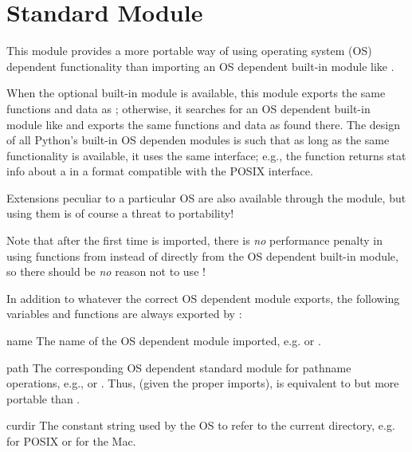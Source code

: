 \section{Standard Module }

This module provides a more portable way of using operating system
(OS) dependent functionality than importing an OS dependent built-in
module like .

When the optional built-in module  is available, this
module exports the same functions and data as ; otherwise,
it searches for an OS dependent built-in module like  and
exports the same functions and data as found there.  The design of all
Python's built-in OS dependen modules is such that as long as the same
functionality is available, it uses the same interface; e.g., the
function  returns stat info about a  in a
format compatible with the POSIX interface.

Extensions peculiar to a particular OS are also available through the
 module, but using them is of course a threat to portability!

Note that after the first time  is imported, there is \emph{no}
performance penalty in using functions from  instead of
directly from the OS dependent built-in module, so there should be
\emph{no} reason not to use !

In addition to whatever the correct OS dependent module exports, the
following variables and functions are always exported by :

\renewcommand{\indexsubitem}{(in module os)}
\begin{datadesc}{name}
The name of the OS dependent module imported, e.g.  or
.
\end{datadesc}

\begin{datadesc}{path}
The corresponding OS dependent standard module for pathname
operations, e.g.,  or .  Thus, (given
the proper imports),  is equivalent to but
more portable than .
\end{datadesc}

\begin{datadesc}{curdir}
The constant string used by the OS to refer to the current directory,
e.g.  for POSIX or  for the Mac.
\end{datadesc}

